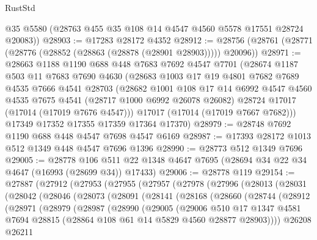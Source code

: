 \begin{lexlean}{RustStd}
\begin{coremodule}
{\begin{coremodule}
{{{{{{{{{{{{{{{{{{{{{{{{{{{{{{{{{{{{{{{{{{{{{{{{{{{{{{{      @35
      @5580
      (@28763 @455 @35 @108 @14 @4547 @4560 @5578 @17551 @28724 @20083))
@28903 := @17283 @28172 @4352
@28912 := @28756 (@28761 (@28771 (@28776 (@28852 (@28863 (@28878 (@28901 @28903))))) @20096))
@28971 := @28663
    @1188
    @1190
    @688
    @448
    @7683
    @7692
    @4547
    @7701
    (@28674
      @1187
      @503
      @11
      @7683
      @7690
      @4630
      (@28683
        @1003
        @17
        @19
        @4801
        @7682
        @7689
        @4535
        @7666
        @4541
        @28703
        (@28682
          @1001
          @108
          @17
          @14
          @6992
          @4547
          @4560
          @4535
          @7675
          @4541
          (@28717 @1000 @6992 @26078 @26082)
          @28724
          @17017
          (@17014 (@17019 @7676 @4547)))
        @17017
        (@17014 (@17019 @7667 @7682)))
      @17349
      @17352
      @17355
      @17359
      @17364
      @17370)
@28979 := @28748 @7692 @1190 @688 @448 @4547 @7698 @4547 @6169
@28987 := @17393 @28172 @1013 @512 @1349 @448 @4547 @7696 @1396
@28990 := @28773 @512 @1349 @7696
@29005 := @28778
    @106
    @511
    @22
    @1348
    @4647
    @7695
    (@28694 @34 @22 @34 @4647 (@16993 (@28699 @34)) @17433)
@29006 := @28778 @119
@29154 := @27887
    (@27912
      (@27953
        (@27955
          (@27957
            (@27978
              (@27996
                (@28013
                  (@28031
                    (@28042
                      (@28046
                        (@28073
                          (@28091
                            (@28141
                              (@28168
                                (@28660
                                  (@28744
                                    (@28912
                                      (@28971
                                        (@28979
                                          (@28987
                                            (@28990
                                              (@29005
                                                (@29006
                                                  @510
                                                  @17
                                                  @1347
                                                  @4581
                                                  @7694
                                                  @28815
                                                  (@28864 @108 @61 @14 @5829 @4560 @28877 @28903))))
                                            @26208
                                            @26211
}}}}}}}}}}}}}}}}}}}}}}}}}}}}}}}}}}}}}}}}}}}}}}}}}}}}}}}
\end{coremodule}}
\end{coremodule}
\end{lexlean}

